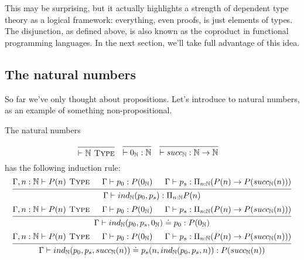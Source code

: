 \documentclass[a4paper, 12pt]{article}
\newcommand{\N}{\mathbb{N}}
\newcommand{\type}{\textsc{ Type}}
\theoremstyle{changedot}
\theoremstyle{changedotbreak}
\theoremstyle{nonumberplain}
\begin{document}
This may be surprising, but it actually highlights a strength of dependent type theory as a logical framework: everything, even proofs, is just elements of types. The disjunction, as defined above, is also known as the coproduct in functional programming languages. In the next section, we'll take full advantage of this idea.

\subsection{The natural numbers}
So far we've only thought about propositions. Let's introduce to natural numbers, as an example of something non-propositional.

\begin{definition}
  The natural numbers

\begin{align*}
 &\begin{prooftree}
    \infer0{\vdash \N \type}
  \end{prooftree}
   &
  &\begin{prooftree}
    \infer0{\vdash 0_{\N} : \N}
    \end{prooftree}
    &
    &\begin{prooftree}
      \infer0{\vdash succ_{\N} : \N \to \N}
    \end{prooftree}
\end{align*}
has the following induction rule:
\begin{align*}
  \begin{prooftree}
    \hypo{\Gamma, n : \N \vdash P(n) \type}
    \hypo{\Gamma \vdash p_{0} : P(0_{\N})}
    \hypo{\Gamma \vdash p_{s} : \Pi_{n:\N} (P(n) \to P(succ_{\N}(n)))}
    \infer3{\Gamma \vdash ind_{\N}(p_{0}, p_{s}) : \Pi_{n:\N} P(n)}
  \end{prooftree}
\end{align*}
\begin{align*}
  \begin{prooftree}
      \hypo{\Gamma, n : \N \vdash P(n) \type}
      \hypo{\Gamma \vdash p_{0} : P(0_{\N})}
      \hypo{\Gamma \vdash p_{s} : \Pi_{n:\N} (P(n) \to P(succ_{\N}(n)))}
      \infer3{\Gamma \vdash ind_{\N}(p_{0}, p_{s}, 0_{\N}) \doteq p_{0} : P(0_{\N})}
  \end{prooftree}
\end{align*}
\begin{align*}
  \begin{prooftree}
      \hypo{\Gamma, n : \N \vdash P(n) \type}
      \hypo{\Gamma \vdash p_{0} : P(0_{\N})}
      \hypo{\Gamma \vdash p_{s} : \Pi_{n:\N} (P(n) \to P(succ_{\N}(n)))}
      \infer3{\Gamma \vdash ind_{\N}(p_{0}, p_{s}, succ_{\N}(n)) \doteq p_{s}(n, ind_{\N}(p_{0}, p_{s}, n)) : P(succ_{\N}(n))}
  \end{prooftree}
\end{align*}
\end{definition}
\end{document}
